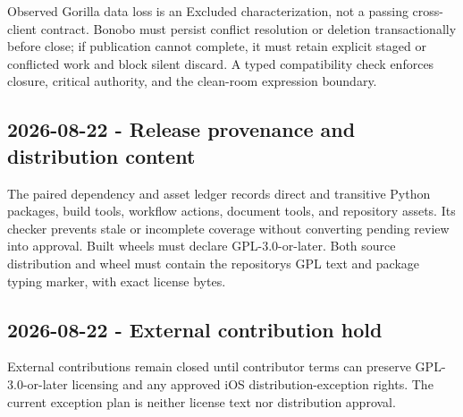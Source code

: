 \documentclass[
  letterpaper,
]{article}
\begin{document}
Observed Gorilla data loss is an Excluded characterization, not a passing cross-client contract. Bonobo must persist
conflict resolution or deletion transactionally before close; if publication cannot complete, it must retain explicit
staged or conflicted work and block silent discard. A typed compatibility check enforces closure, critical authority,
and the clean-room expression boundary.

\subsection{2026-08-22 - Release provenance and distribution
content}\label{2026-08-22---release-provenance-and-distribution-content}

The paired dependency and asset ledger records direct and transitive Python packages, build tools, workflow actions,
document tools, and repository assets. Its checker prevents stale or incomplete coverage without converting pending
review into approval. Built wheels must declare GPL-3.0-or-later. Both source distribution and wheel must contain the
repository\textquotesingle s GPL text and package typing marker, with exact license bytes.

\subsection{2026-08-22 - External contribution hold}\label{2026-08-22---external-contribution-hold}

External contributions remain closed until contributor terms can preserve GPL-3.0-or-later licensing and any approved
iOS distribution-exception rights. The current exception plan is neither license text nor distribution approval.
\end{document}

